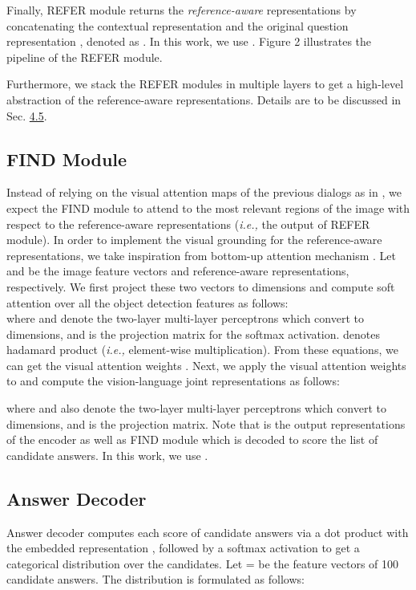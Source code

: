 \documentclass[11pt,a4paper]{article}
\begin{document}
Finally, REFER module returns the {\it reference-aware} representations by concatenating the contextual representation  and the original question representation , denoted as  . In this work, we use . Figure 2 illustrates the pipeline of the REFER module.

Furthermore, we stack the REFER modules in multiple layers to get a high-level abstraction of the reference-aware representations. Details are to be discussed in Sec. \hyperref[sec:abl]{4.5}. 

\subsection{FIND Module}
\label{sec:find}
Instead of relying on the visual attention maps of the previous dialogs as in \cite{seo2017visual,kottur2018visual,niu2018recursive}, we expect the FIND module to attend to the most relevant regions of the image with respect to the reference-aware representations ({\it i.e.,} the output of REFER module). In order to implement the visual grounding for the reference-aware representations, we take inspiration from bottom-up attention mechanism \cite{Anderson2017up-down}. Let    and    be the image feature vectors and reference-aware representations, respectively. We first project these two vectors to  dimensions and compute soft attention over all the object detection features as follows: \\



where  and  denote the two-layer multi-layer perceptrons which convert to  dimensions, and   is the projection matrix for the softmax activation.  denotes hadamard product ({\it i.e.,} element-wise multiplication). From these equations, we can get the visual attention weights  . Next, we apply the visual attention weights to  and compute the vision-language joint representations as follows:



where  and  also denote the two-layer multi-layer perceptrons which convert to  dimensions, and   is the projection matrix. Note that   is the output representations of the encoder as well as FIND module which is decoded to score the list of candidate answers. In this work, we use . 

\subsection{Answer Decoder}
\label{sec:ansdec}
Answer decoder computes each score of candidate answers via a dot product with the embedded representation , followed by a softmax activation to get a categorical distribution over the candidates. Let  = {\it }   be the feature vectors of 100 candidate answers. The distribution  is formulated as follows:
\end{document}

